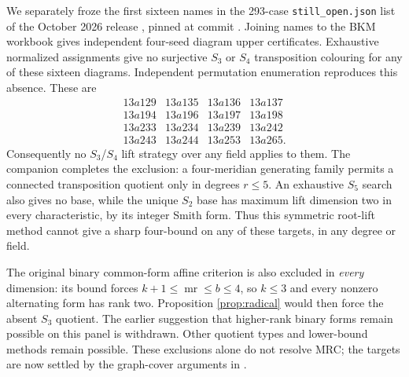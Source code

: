 \documentclass[11pt]{article}
\newcommand{\mr}{\operatorname{mr}}
\begin{document}
We separately froze the first sixteen names in the 293-case
\texttt{still\_open.json} list of the October 2026 release
\cite{bhat}, pinned at commit
. Joining names to
the BKM workbook gives independent four-seed diagram upper certificates.
Exhaustive normalized assignments give no surjective $S_3$ or $S_4$
transposition colouring for any of these sixteen diagrams. Independent
permutation enumeration reproduces this absence. These are
\[
\begin{array}{rrrr}
13a129&13a135&13a136&13a137\\
13a194&13a196&13a197&13a198\\
13a233&13a234&13a239&13a242\\
13a243&13a244&13a253&13a265.
\end{array}
\]
Consequently no $S_3$/$S_4$ lift strategy over any field applies to
them. The companion  completes
the exclusion: a four-meridian generating family permits a connected
transposition quotient only in degrees $r\le5$. An exhaustive $S_5$
search also gives no base, while the unique $S_2$ base has maximum
lift dimension two in every characteristic, by its integer Smith form.
Thus this symmetric root-lift method cannot give a sharp four-bound
on any of these targets, in any degree or field.

The original binary common-form affine criterion is also excluded in
\emph{every} dimension: its bound forces $k+1\le\mr\le b\le4$, so
$k\le3$ and every nonzero alternating form has rank two. Proposition
\ref{prop:radical} would then force the absent $S_3$ quotient. The
earlier suggestion that higher-rank binary forms remain possible on
this panel is withdrawn. Other quotient types and lower-bound methods
remain possible. These exclusions alone do not resolve MRC; the targets
are now settled by the graph-cover arguments in
.
\end{document}
